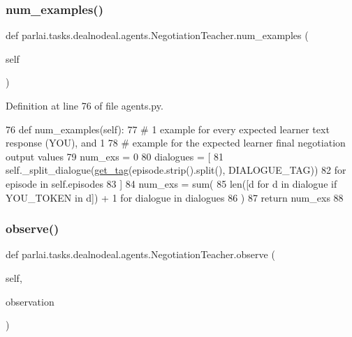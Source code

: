 \subsubsection{\texorpdfstring{num\+\_\+examples()}{num\_examples()}}
{\footnotesize\ttfamily def parlai.\+tasks.\+dealnodeal.\+agents.\+Negotiation\+Teacher.\+num\+\_\+examples (\begin{DoxyParamCaption}\item[{}]{self }\end{DoxyParamCaption})}



Definition at line 76 of file agents.\+py.


\begin{DoxyCode}
76     \textcolor{keyword}{def }num\_examples(self):
77         \textcolor{comment}{# 1 example for every expected learner text response (YOU), and 1}
78         \textcolor{comment}{# example for the expected learner final negotiation output values}
79         num\_exs = 0
80         dialogues = [
81             self.\_split\_dialogue(\hyperlink{namespaceparlai_1_1tasks_1_1onecommon_1_1agents_ad40f47306fdc2563ccac42a81c5620f6}{get\_tag}(episode.strip().split(), DIALOGUE\_TAG))
82             \textcolor{keywordflow}{for} episode \textcolor{keywordflow}{in} self.episodes
83         ]
84         num\_exs = sum(
85             len([d \textcolor{keywordflow}{for} d \textcolor{keywordflow}{in} dialogue \textcolor{keywordflow}{if} YOU\_TOKEN \textcolor{keywordflow}{in} d]) + 1 \textcolor{keywordflow}{for} dialogue \textcolor{keywordflow}{in} dialogues
86         )
87         \textcolor{keywordflow}{return} num\_exs
88 
\end{DoxyCode}
\mbox{\label{classparlai_1_1tasks_1_1dealnodeal_1_1agents_1_1NegotiationTeacher_aa1a512ed945c5fc33a90005b25ef817f}} 
\subsubsection{\texorpdfstring{observe()}{observe()}}
{\footnotesize\ttfamily def parlai.\+tasks.\+dealnodeal.\+agents.\+Negotiation\+Teacher.\+observe (\begin{DoxyParamCaption}\item[{}]{self,  }\item[{}]{observation }\end{DoxyParamCaption})}

